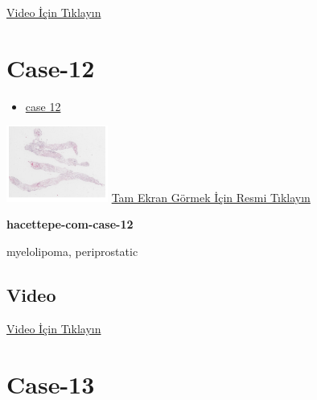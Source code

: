 \documentclass[
  letterpaper,
  DIV=11,
  numbers=noendperiod]{scrreprt}
\providecommand{\tightlist}{%
  \setlength{\itemsep}{0pt}\setlength{\parskip}{0pt}}\usepackage{longtable,booktabs,array}
\begin{document}
\href{https://www.youtube.com/watch?v=A5XO1Kp11Zk}{Video İçin Tıklayın}

\hypertarget{sec-hacettepe-case-of-the-month-case-12}{%
\section{Case-12}\label{sec-hacettepe-case-of-the-month-case-12}}

\begin{itemize}
\tightlist
\item
  \href{https://www.youtube.com/watch?v=2TwT4sE9XmM\&ab_channel=KemalKosemehmetoglu}{case
  12}
\end{itemize}

\href{https://images.patolojiatlasi.com/hacettepe-com-case-12/HE.html}{\includegraphics[width=0.25\textwidth,height=\textheight]{./screenshots/hacettepe-com-case-12_screenshot.png}}
\href{https://images.patolojiatlasi.com/hacettepe-com-case-12/HE.html}{Tam
Ekran Görmek İçin Resmi Tıklayın}

\textbf{hacettepe-com-case-12}

\begin{tcolorbox}[enhanced jigsaw, left=2mm, toprule=.15mm, rightrule=.15mm, bottomrule=.15mm, leftrule=.75mm, colback=white, colframe=quarto-callout-tip-color-frame, toptitle=1mm, breakable, titlerule=0mm, colbacktitle=quarto-callout-tip-color!10!white, bottomtitle=1mm, title=\textcolor{quarto-callout-tip-color}{\faLightbulb}\hspace{0.5em}{Tanı}, arc=.35mm, opacitybacktitle=0.6, opacityback=0, coltitle=black]

myelolipoma, periprostatic

\end{tcolorbox}

\hypertarget{video-10}{%
\subsection{Video}\label{video-10}}

\href{https://www.youtube.com/watch?v=2TwT4sE9XmM}{Video İçin Tıklayın}

\hypertarget{sec-hacettepe-case-of-the-month-case-13}{%
\section{Case-13}\label{sec-hacettepe-case-of-the-month-case-13}}
\end{document}
